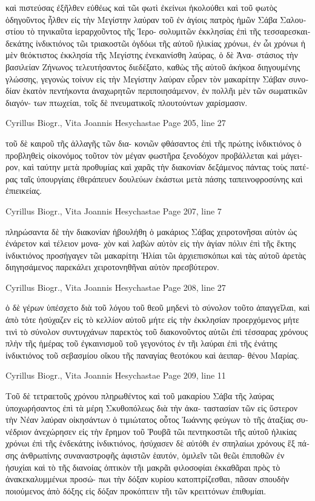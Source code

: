 \documentclass[12pt,letterpaper,twoside,final]{memoir}
\begin{document}
\begin{greek}
καὶ πιστεύσας ἐξῆλθεν εὐθέως καὶ τῶι φωτὶ ἐκείνωι ἠκολούθει καὶ 
τοῦ φωτὸς ὁδηγοῦντος ἦλθεν εἰς τὴν Μεγίστην λαύραν τοῦ ἐν ἁγίοις 
πατρὸς ἡμῶν Σάβα Σαλουστίου τὸ τηνικαῦτα ἱεραρχοῦντος τῆς Ἱερο-
σολυμιτῶν ἐκκλησίας ἐπὶ τῆς τεσσαρεσκαιδεκάτης ἰνδικτιόνος τῶι 
τριακοστῶι ὀγδόωι τῆς αὐτοῦ ἡλικίας χρόνωι, ἐν ὧι χρόνωι ἡ μὲν 
θεόκτιστος ἐκκλησία τῆς Μεγίστης ἐνεκαινίσθη λαύρας, ὁ δὲ Ἀνα-  
στάσιος τὴν βασιλείαν Ζήνωνος τελευτήσαντος διεδέξατο, καθὼς τῆς 
αὐτοῦ ἀκήκοα διηγουμένης γλώσσης, γεγονὼς τοίνυν εἰς τὴν Μεγίστην 
λαύραν εὗρεν τὸν μακαρίτην Σάβαν συνοδίαν ἑκατὸν πεντήκοντα 
ἀναχωρητῶν περιποιησάμενον, ἐν πολλῆι μὲν τῶν σωματικῶν διαγόν-
των πτωχείαι, τοῖς δὲ πνευματικοῖς πλουτούντων χαρίσμασιν. 



Cyrillus Biogr., Vita Joannis Hesychastae 
Page 205, line 27

                                   τοῦ δὲ καιροῦ τῆς ἀλλαγῆς τῶν δια-
κονιῶν φθάσαντος ἐπὶ τῆς πρώτης ἰνδικτιόνος ὁ προβληθεὶς οἰκονόμος 
τοῦτον τὸν μέγαν φωστῆρα ξενοδόχον προβάλλεται καὶ μάγειρον, καὶ   
ταύτην μετὰ προθυμίας καὶ χαρᾶς τὴν διακονίαν δεξάμενος πάντας 
τοὺς πατέρας ταῖς ὑπουργίαις ἐθεράπευεν δουλεύων ἑκάστωι μετὰ 
πάσης ταπεινοφροσύνης καὶ ἐπιεικείας. 



Cyrillus Biogr., Vita Joannis Hesychastae 
Page 207, line 7

                               πληρώσαντα δὲ τὴν διακονίαν ἠβουλήθη 
ὁ μακάριος Σάβας χειροτονῆσαι αὐτὸν ὡς ἐνάρετον καὶ τέλειον μονα-
χὸν καὶ λαβὼν αὐτὸν εἰς τὴν ἁγίαν πόλιν ἐπὶ τῆς ἕκτης ἰνδικτιόνος 
προσήγαγεν τῶι μακαρίτηι Ἡλίαι τῶι ἀρχιεπισκόπωι καὶ τὰς αὐτοῦ 
ἀρετὰς διηγησάμενος παρεκάλει χειροτονηθῆναι αὐτὸν πρεσβύτερον. 



Cyrillus Biogr., Vita Joannis Hesychastae 
Page 208, line 27

ὁ δὲ γέρων ὑπέσχετο διὰ τοῦ λόγου τοῦ θεοῦ μηδενὶ τὸ σύνολον 
τοῦτο ἀπαγγεῖλαι, καὶ ἀπὸ τότε ἡσύχαζεν εἰς τὸ κελλίον αὐτοῦ μήτε 
εἰς τὴν ἐκκλησίαν προερχόμενος μήτε τινὶ τὸ σύνολον συντυγχάνων 
παρεκτὸς τοῦ διακονοῦντος αὐτῶι ἐπὶ τέσσαρας χρόνους πλὴν τῆς 
ἡμέρας τοῦ ἐγκαινισμοῦ τοῦ γεγονότος ἐν τῆι λαύραι ἐπὶ τῆς ἐνάτης 
ἰνδικτιόνος τοῦ σεβασμίου οἴκου τῆς παναγίας θεοτόκου καὶ ἀειπαρ-  
θένου Μαρίας. 



Cyrillus Biogr., Vita Joannis Hesychastae 
Page 209, line 11

Τοῦ δὲ τετραετοῦς χρόνου πληρωθέντος καὶ τοῦ μακαρίου Σάβα 
τῆς λαύρας ὑποχωρήσαντος ἐπὶ τὰ μέρη Σκυθοπόλεως διὰ τὴν ἀκα-
ταστασίαν τῶν εἰς ὕστερον τὴν Νέαν λαύραν οἰκησάντων ὁ τιμιώτατος 
οὗτος Ἰωάννης φεύγων τὸ τῆς ἀταξίας συνέδριον ἀνεχώρησεν εἰς 
τὴν ἔρημον τοῦ Ῥουβᾶ τῶι πεντηκοστῶι τῆς αὐτοῦ ἡλικίας χρόνωι 
ἐπὶ τῆς ἑνδεκάτης ἰνδικτιόνος, ἡσύχασεν δὲ αὐτόθι ἐν σπηλαίωι 
χρόνους ἓξ πάσης ἀνθρωπίνης συναναστροφῆς ἀφιστῶν ἑαυτόν, 
ὁμιλεῖν τῶι θεῶι ἐπιποθῶν ἐν ἡσυχίαι καὶ τὸ τῆς διανοίας ὀπτικὸν 
τῆι μακρᾶι φιλοσοφίαι ἐκκαθᾶραι πρὸς τὸ ἀνακεκαλυμμένωι προσώ-
πωι τὴν δόξαν κυρίου κατοπτρίζεσθαι, πᾶσαν σπουδὴν ποιούμενος 
ἀπὸ δόξης εἰς δόξαν προκόπτειν τῆι τῶν κρειττόνων ἐπιθυμίαι. 




\end{greek}
\end{document}
